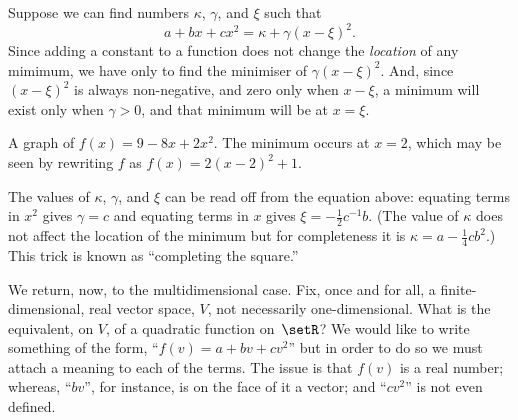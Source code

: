 \documentclass[10pt, a4paper]{article}
\begin{document}
Suppose we can find numbers $\kappa$, $\gamma$, and $\xi$ such that
\begin{equation}
  a + bx + cx^2 = \kappa + \gamma{(x - \xi)}^2.
\label{eq:completing-the-square}
\end{equation}
Since adding a constant to a function does not change the
\emph{location} of any mimimum, we have only to find the minimiser of
$\gamma{(x-\xi)}^2$. And, since ${(x-\xi)}^2$ is always non-negative, and zero
only when $x-\xi$, a minimum will exist only when $\gamma >0$, and that
minimum will be at $x=\xi$.
\begin{marginfigure}
  \begin{center}
  \end{center}
\caption{A graph of $f(x) = 9 - 8x + 2x^2$. The minimum occurs at
  $x=2$, which may be seen by rewriting $f$ as $f(x) =
  2{(x-2)}^2+1$.\label{fig:quadratic}}
\end{marginfigure}
The values of $\kappa$, $\gamma$, and $\xi$ can be read off from the equation
above: equating terms in $x^2$ gives $\gamma=c$ and equating terms in
$x$ gives $\xi=-\frac{1}{2}c^{-1}b$. (The value of $\kappa$ does not affect
the location of the minimum but for completeness it is
$\kappa=a-\frac{1}{4}cb^2$.) This trick is known as “completing the
square.”

We return, now, to the multidimensional case. Fix, once and for all, a
finite-dimensional, real vector space, $V$, not necessarily
one-dimensional. What is the equivalent, on $V$, of a quadratic
function on~$\setR$? We would like to write something of the form,
“$f(v) = a+bv+cv^2$” but in order to do so we must attach a meaning to
each of the terms. The issue is that $f(v)$ is a real number; whereas,
“$bv$”, for instance, is on the face of it a vector; and “$cv^2$” is
not even defined.
\end{document}

